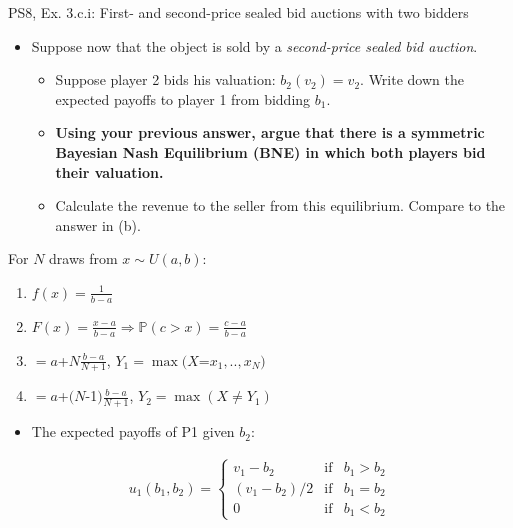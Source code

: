 \begin{frame}{PS8, Ex. 3.c.i: First- and second-price sealed bid auctions with two bidders}
    \begin{multicols}{2}
      \begin{itemize}
        \item[(c)] Suppose now that the object is sold by a \textit{second-price sealed bid auction}.
        \begin{itemize}\normalsize
          \item[i.]   Suppose player 2 bids his valuation: $b_2(v_2) = v_2$. Write down the expected payoffs to player 1 from bidding $b_1$.
          \item[ii.]  \textbf{Using your previous answer, argue that there is a symmetric Bayesian Nash Equilibrium (BNE) in which both players bid their valuation.}
          \item[iii.] Calculate the revenue to the seller from this equilibrium. Compare to the answer in (b).
        \end{itemize}
      \end{itemize}
      For $N$ draws from $x\sim U(a, b):$
      \vspace{-6pt}
      \begin{enumerate}
        \item[PDF:] $f(x)=\frac{1}{b-a}$
        \item[CDF:] $F(x)=\frac{x-a}{b-a}\Rightarrow\mathbb{P}(c>x)=\frac{c-a}{b-a}$
        \item[$\mathbb{E}(Y_1)$] $=a$+$N\frac{b-a}{N+1}$, $Y_1=\max(X$=$x_1,..,x_N)$
        \item[$\mathbb{E}(Y_2)$] $=a$+$(N$-1$)\frac{b-a}{N+1}$, $Y_2=\max(X\neq Y_1)$
      \end{enumerate}
      \vfill\null\columnbreak
      \begin{itemize}
        \item[(i)] The expected payoffs of P1 given $b_2$:
      \end{itemize}
      \vspace{-12pt}
      \begin{align*}
        u_1(b_1,b_2)=\left\{\begin{array}{lcl}
          v_1-b_2     & \text{if} & b_1>b_2 \\
          (v_1-b_2)/2 & \text{if} & b_1=b_2 \\
          0           & \text{if} & b_1<b_2
        \end{array}\right.
      \end{align*}
      \vfill\null
    \end{multicols}
\end{frame}


